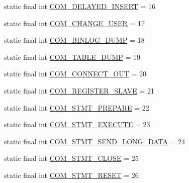 \begin{DoxyCompactItemize}
\item 
static final int \mbox{\hyperlink{classcom_1_1mysql_1_1cj_1_1protocol_1_1a_1_1_native_constants_ab157bf953f95685f1147763f6e292174}{C\+O\+M\+\_\+\+D\+E\+L\+A\+Y\+E\+D\+\_\+\+I\+N\+S\+E\+RT}} = 16
\item 
static final int \mbox{\hyperlink{classcom_1_1mysql_1_1cj_1_1protocol_1_1a_1_1_native_constants_ad3b38832057a36b5b3df14afa0194c61}{C\+O\+M\+\_\+\+C\+H\+A\+N\+G\+E\+\_\+\+U\+S\+ER}} = 17
\item 
static final int \mbox{\hyperlink{classcom_1_1mysql_1_1cj_1_1protocol_1_1a_1_1_native_constants_aba8148dac7ce8f20da89994a8c1254fa}{C\+O\+M\+\_\+\+B\+I\+N\+L\+O\+G\+\_\+\+D\+U\+MP}} = 18
\item 
static final int \mbox{\hyperlink{classcom_1_1mysql_1_1cj_1_1protocol_1_1a_1_1_native_constants_a3b80bcaf392c3172664aa3feee6788e8}{C\+O\+M\+\_\+\+T\+A\+B\+L\+E\+\_\+\+D\+U\+MP}} = 19
\item 
static final int \mbox{\hyperlink{classcom_1_1mysql_1_1cj_1_1protocol_1_1a_1_1_native_constants_a2a9ef3ebae415316292cf407a445db17}{C\+O\+M\+\_\+\+C\+O\+N\+N\+E\+C\+T\+\_\+\+O\+UT}} = 20
\item 
static final int \mbox{\hyperlink{classcom_1_1mysql_1_1cj_1_1protocol_1_1a_1_1_native_constants_ac74102de10d643ec51e2370fffb1adc0}{C\+O\+M\+\_\+\+R\+E\+G\+I\+S\+T\+E\+R\+\_\+\+S\+L\+A\+VE}} = 21
\item 
static final int \mbox{\hyperlink{classcom_1_1mysql_1_1cj_1_1protocol_1_1a_1_1_native_constants_a0602904b77c85c86e90e27df51750606}{C\+O\+M\+\_\+\+S\+T\+M\+T\+\_\+\+P\+R\+E\+P\+A\+RE}} = 22
\item 
static final int \mbox{\hyperlink{classcom_1_1mysql_1_1cj_1_1protocol_1_1a_1_1_native_constants_a29fdfdf5694fb6c155f4a96f8d2d9088}{C\+O\+M\+\_\+\+S\+T\+M\+T\+\_\+\+E\+X\+E\+C\+U\+TE}} = 23
\item 
static final int \mbox{\hyperlink{classcom_1_1mysql_1_1cj_1_1protocol_1_1a_1_1_native_constants_a565e9a42f9d8973aea4a98f63e14e3d0}{C\+O\+M\+\_\+\+S\+T\+M\+T\+\_\+\+S\+E\+N\+D\+\_\+\+L\+O\+N\+G\+\_\+\+D\+A\+TA}} = 24
\item 
static final int \mbox{\hyperlink{classcom_1_1mysql_1_1cj_1_1protocol_1_1a_1_1_native_constants_a0fc595370c48e43927dfaf1c52127d8d}{C\+O\+M\+\_\+\+S\+T\+M\+T\+\_\+\+C\+L\+O\+SE}} = 25
\item 
static final int \mbox{\hyperlink{classcom_1_1mysql_1_1cj_1_1protocol_1_1a_1_1_native_constants_ae804604186043e98f273f12187cebcb1}{C\+O\+M\+\_\+\+S\+T\+M\+T\+\_\+\+R\+E\+S\+ET}} = 26

\end{DoxyCompactItemize}
